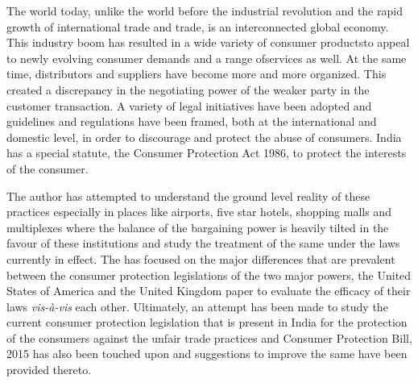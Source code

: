 \setcounter{figure}{0}
\setcounter{table}{0}

\label{2017-art1}

\begin{multicols}{2}


\vspace{.1cm}

\noi
The world today, unlike the world before the industrial revolution and the rapid growth of
international trade and trade, is an interconnected global economy. This industry boom has
resulted in a wide variety of consumer productsto appeal to newly evolving consumer demands
and a range ofservices as well. At the same time, distributors and suppliers have become more
and more organized. This created a discrepancy in the negotiating power of the weaker party
in the customer transaction. A variety of legal initiatives have been adopted and guidelines and
regulations have been framed, both at the international and domestic level, in order to
discourage and protect the abuse of consumers. India has a special statute, the Consumer
Protection Act 1986, to protect the interests of the consumer.

\vspace{.1cm}

\noi
The author has attempted to understand the ground level reality of these practices especially in
places like airports, five star hotels, shopping malls and multiplexes where the balance of the
bargaining power is heavily tilted in the favour of these institutions and study the treatment of
the same under the laws currently in effect. The has focused on the major differences that are
prevalent between the consumer protection legislations of the two major powers, the United
States of America and the United Kingdom paper to evaluate the efficacy of their laws \textit{vis-à-vis} each other. Ultimately, an attempt has been made to study the current consumer protection
legislation that is present in India for the protection of the consumers against the unfair trade
practices and Consumer Protection Bill, 2015 has also been touched upon and suggestions to
improve the same have been provided thereto.


\end{multicols}
